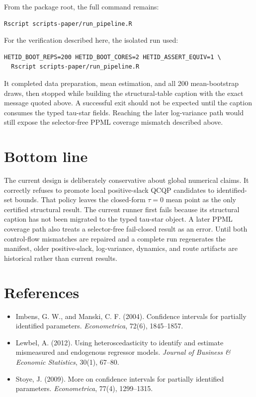 \documentclass[11pt]{article}
\begin{document}
From the package root, the full command remains:
\begin{verbatim}
Rscript scripts-paper/run_pipeline.R
\end{verbatim}

For the verification described here, the isolated run used:
\begin{verbatim}
HETID_BOOT_REPS=200 HETID_BOOT_CORES=2 HETID_ASSERT_EQUIV=1 \
  Rscript scripts-paper/run_pipeline.R
\end{verbatim}

It completed data preparation, mean estimation, and all 200 mean-bootstrap
draws, then stopped while building the structural-table caption with the exact
message quoted above. A successful exit should not be expected until the
caption consumes the typed tau-star fields. Reaching the later log-variance
path would still expose the selector-free PPML coverage mismatch described
above.

\section{Bottom line}

The current design is deliberately conservative about global numerical
claims. It correctly refuses to promote local positive-slack QCQP candidates
to identified-set bounds. That policy leaves the closed-form $\tau=0$ mean
point as the only certified structural result. The current runner first fails
because its structural caption has not been migrated to the typed tau-star
object. A later PPML coverage path also treats a selector-free fail-closed
result as an error. Until both control-flow mismatches are repaired and a
complete run regenerates the manifest, older positive-slack, log-variance,
dynamics, and route artifacts are historical rather than current results.

\section*{References}

\begin{itemize}[leftmargin=1.5em]
  \item Imbens, G. W., and Manski, C. F. (2004). Confidence intervals for
    partially identified parameters. \emph{Econometrica}, 72(6), 1845--1857.
  \item Lewbel, A. (2012). Using heteroscedasticity to identify and estimate
    mismeasured and endogenous regressor models.
    \emph{Journal of Business \& Economic Statistics}, 30(1), 67--80.
  \item Stoye, J. (2009). More on confidence intervals for partially
    identified parameters. \emph{Econometrica}, 77(4), 1299--1315.
\end{itemize}
\end{document}
